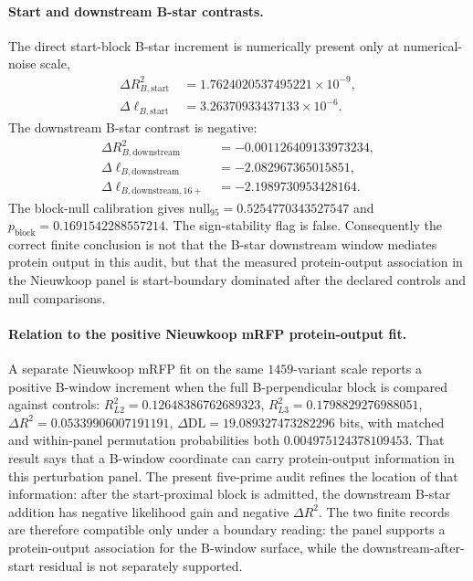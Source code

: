 \paragraph{Start and downstream B-star contrasts.}
The direct start-block B-star increment is numerically present only at numerical-noise scale,
$$
\begin{aligned}
\Delta R^2_{B,\mathrm{start}} &= 1.7624020537495221 \times 10^{-9},\\
\Delta \ell_{B,\mathrm{start}} &= 3.26370933437133 \times 10^{-6} .
\end{aligned}
$$
The downstream B-star contrast is negative:
$$
\begin{aligned}
\Delta R^2_{B,\mathrm{downstream}} &= -0.001126409133973234,\\
\Delta \ell_{B,\mathrm{downstream}} &= -2.082967365015851,\\
\Delta \ell_{B,\mathrm{downstream},16+} &= -2.1989730953428164 .
\end{aligned}
$$
The block-null calibration gives $\mathrm{null}_{95}=0.5254770343527547$ and $p_{\mathrm{block}}=0.1691542288557214$.  The sign-stability flag is false.  Consequently the correct finite conclusion is not that the B-star downstream window mediates protein output in this audit, but that the measured protein-output association in the Nieuwkoop panel is start-boundary dominated after the declared controls and null comparisons.

\paragraph{Relation to the positive Nieuwkoop mRFP protein-output fit.}
A separate Nieuwkoop mRFP fit on the same $1459$-variant scale reports a positive B-window increment when the full B-perpendicular block is compared against controls: $R^2_{L2}=0.12648386762689323$, $R^2_{L3}=0.1798829276988051$, $\Delta R^2=0.05339906007191191$, $\Delta \mathrm{DL}=19.089327473282296$ bits, with matched and within-panel permutation probabilities both $0.004975124378109453$.  That result says that a B-window coordinate can carry protein-output information in this perturbation panel.  The present five-prime audit refines the location of that information: after the start-proximal block is admitted, the downstream B-star addition has negative likelihood gain and negative $\Delta R^2$.  The two finite records are therefore compatible only under a boundary reading: the panel supports a protein-output association for the B-window surface, while the downstream-after-start residual is not separately supported.

